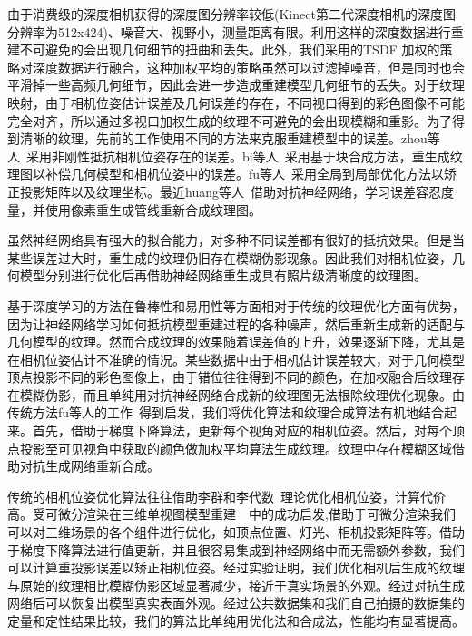 由于消费级的深度相机获得的深度图分辨率较低(Kinect第二代深度相机的深度图分辨率为512x424)、噪音大、视野小，测量距离有限。利用这样的深度数据进行重建不可避免的会出现几何细节的扭曲和丢失。此外，我们采用的TSDF 加权的策略对深度数据进行融合，这种加权平均的策略虽然可以过滤掉噪音，但是同时也会平滑掉一些高频几何细节，因此会进一步造成重建模型几何细节的丢失。对于纹理映射，由于相机位姿估计误差及几何误差的存在，不同视口得到的彩色图像不可能完全对齐，所以通过多视口加权生成的纹理不可避免的会出现模糊和重影。为了得到清晰的纹理，先前的工作使用不同的方法来克服重建模型中的误差。zhou等人~\cite{zhou2014color}采用非刚性抵抗相机位姿存在的误差。bi等人~\cite{bi2017patch}采用基于块合成方法，重生成纹理图以补偿几何模型和相机位姿中的误差。fu等人~\cite{fu2018texture}采用全局到局部优化方法以矫正投影矩阵以及纹理坐标。最近huang等人~\cite{JingweiHuang2020AdversarialTO}借助对抗神经网络，学习误差容忍度量，并使用像素重生成管线重新合成纹理图。\par
虽然神经网络具有强大的拟合能力，对多种不同误差都有很好的抵抗效果。但是当某些误差过大时，重生成的纹理仍旧存在模糊伪影现象。因此我们对相机位姿，几何模型分别进行优化后再借助神经网络重生成具有照片级清晰度的纹理图。\par
基于深度学习的方法在鲁棒性和易用性等方面相对于传统的纹理优化方面有优势，因为让神经网络学习如何抵抗模型重建过程的各种噪声，然后重新生成新的适配与几何模型的纹理。然而合成纹理的效果随着误差值的上升，效果逐渐下降，尤其是在相机位姿估计不准确的情况。某些数据中由于相机估计误差较大，对于几何模型顶点投影不同的彩色图像上，由于错位往往得到不同的颜色，在加权融合后纹理存在模糊伪影，而且单纯用对抗神经网络合成新的纹理图无法根除纹理优化现象。由传统方法fu等人的工作~\cite{fu2018texture}得到启发，我们将优化算法和纹理合成算法有机地结合起来。首先，借助于梯度下降算法，更新每个视角对应的相机位姿。然后，对每个顶点投影至可见视角中获取的颜色做加权平均算法生成纹理。纹理中存在模糊区域借助对抗生成网络重新合成。\par
传统的相机位姿优化算法往往借助李群和李代数~\cite{sola2018micro}理论优化相机位姿，计算代价高。受可微分渲染在三维单视图模型重建~\cite{liu2020general}~\cite{ShichenLiu2019SoftRA}中的成功启发,借助于可微分渲染我们可以对三维场景的各个组件进行优化，如顶点位置、灯光、相机投影矩阵等。借助于梯度下降算法进行值更新，并且很容易集成到神经网络中而无需额外参数，我们可以计算重投影误差以矫正相机位姿。经过实验证明，我们优化相机后生成的纹理与原始的纹理相比模糊伪影区域显著减少，接近于真实场景的外观。经过对抗生成网络后可以恢复出模型真实表面外观。经过公共数据集和我们自己拍摄的数据集的定量和定性结果比较，我们的算法比单纯用优化法和合成法，性能均有显著提高。
